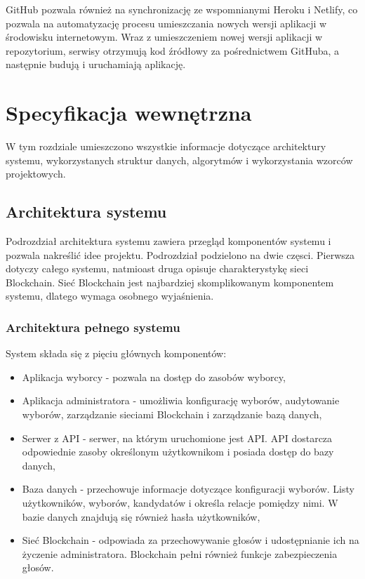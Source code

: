 \documentclass[a4paper,12pt]{book}
\begin{document}
GitHub pozwala również na synchronizację ze wspomnianymi Heroku i Netlify, co pozwala na automatyzację procesu umieszczania nowych wersji aplikacji w środowisku internetowym. Wraz z umieszczeniem nowej wersji aplikacji w repozytorium, serwisy otrzymują kod źródłowy za pośrednictwem GitHuba, a następnie budują i uruchamiają aplikację.


\chapter{Specyfikacja wewnętrzna}

W tym rozdziale umieszczono wszystkie informacje dotyczące architektury systemu, wykorzystanych struktur danych, algorytmów i wykorzystania wzorców projektowych.

\section{Architektura systemu}
Podrozdział architektura systemu zawiera przegląd komponentów systemu i pozwala nakreślić idee projektu. Podrozdział podzielono na dwie częsci. Pierwsza dotyczy całego systemu, natmioast druga opisuje charakterystykę sieci Blockchain. Sieć Blockchain jest najbardziej skomplikowanym komponentem systemu, dlatego wymaga osobnego wyjaśnienia. 

\subsection{Architektura pełnego systemu}

System składa się z pięciu głównych komponentów:
\begin {itemize}
	\item Aplikacja wyborcy - pozwala na dostęp do zasobów wyborcy,
	\item Aplikacja administratora - umożliwia konfigurację wyborów, audytowanie wyborów, zarządzanie sieciami Blockchain i zarządzanie bazą danych,
	\item Serwer z API - serwer, na którym uruchomione jest API. API dostarcza odpowiednie zasoby określonym użytkownikom i posiada dostęp do bazy danych,
	\item Baza danych - przechowuje informacje dotyczące konfiguracji wyborów. Listy użytkowników, wyborów, kandydatów i określa relacje pomiędzy nimi. W bazie danych znajdują się również hasła użytkowników,
	\item Sieć Blockchain - odpowiada za przechowywanie głosów i udostępnianie ich na życzenie administratora. Blockchain pełni również funkcje zabezpieczenia głosów.
\end {itemize}
\end{document}
